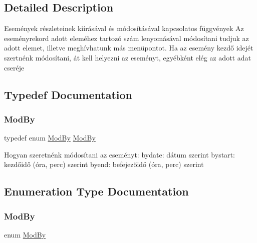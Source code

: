 \subsection{Detailed Description}
Események részleteinek kiírásával és módosításával kapcsolatos függvények Az eseményrekord adott eleméhez tartozó szám lenyomásával módosítani tudjuk az adott elemet, illetve meghívhatunk más menüpontot. Ha az esemény kezdő idejét szertnénk módosítani, át kell helyezni az eseményt, egyébként elég az adott adat cseréje 

\subsection{Typedef Documentation}
\mbox{\label{group__eventrecord_ga362ee478a7a01737cf42d32360eda02e}} 
\subsubsection{\texorpdfstring{Mod\+By}{ModBy}}
{\footnotesize\ttfamily typedef enum \hyperlink{group__eventrecord_ga643f8b09cbc45afc4ad36b27c077b1fd}{Mod\+By} \hyperlink{group__eventrecord_ga643f8b09cbc45afc4ad36b27c077b1fd}{Mod\+By}}

Hogyan szeretnénk módosítani az eseményt\+: bydate\+: dátum szerint bystart\+: kezdőidő (óra, perc) szerint byend\+: befejezőidő (óra, perc) szerint 

\subsection{Enumeration Type Documentation}
\mbox{\label{group__eventrecord_ga643f8b09cbc45afc4ad36b27c077b1fd}} 
\subsubsection{\texorpdfstring{Mod\+By}{ModBy}}
{\footnotesize\ttfamily enum \hyperlink{group__eventrecord_ga643f8b09cbc45afc4ad36b27c077b1fd}{Mod\+By}}

